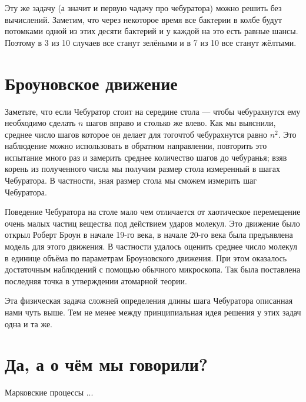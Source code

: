 \documentclass{article}
\begin{document}
\medskip

Эту же задачу (а значит и первую чадачу про чебуратора)
можно решить без вычислений.
Заметим, что через некоторое время все бактерии в колбе будут потомками одной из этих десяти бактерий и у каждой на это есть равные шансы.
Поэтому в 3 из 10 случаев все станут зелёными и в 7 из 10 все станут жёлтыми.

\section{Броуновское движение}

Заметьте, что если Чебуратор стоит на середине стола ---
чтобы чебурахнутся ему необходимо сделать $n$ шагов вправо и столько же влево.
Как мы выяснили, 
среднее число шагов которое он делает для тогочтоб чебурахнутся 
равно $n^2$.
Это наблюдение можно использовать в обратном направлении,
повторить это испытание много раз и 
замерить среднее количество шагов до чебуранья;
взяв корень из полученного числа мы получим размер стола 
измеренный в шагах Чебуратора.
В частности, зная размер стола мы сможем измерить шаг Чебуратора.

Поведение Чебуратора на столе мало чем отличается 
от хаотическое перемещение очень малых частиц вещества под действием ударов молекул. 
Это движение было открыл Роберт Броун в начале 19-го века, 
в начале 20-го века была предъявлена модель для этого движения.
В частности удалось оценить среднее число молекул в единице объёма по параметрам Броуновского движения.
При этом оказалось достаточным наблюдений с помощью обычного микроскопа.
Так была поставлена последняя точка в утверждении атомарной теории.

Эта физическая задача сложней определения длины шага Чебуратора описанная нами чуть выше.
Тем не менее между принципиальная идея решения у этих задач одна и та же.

\section{Да, а о чём мы говорили?}

Марковские процессы ...
\end{document}
